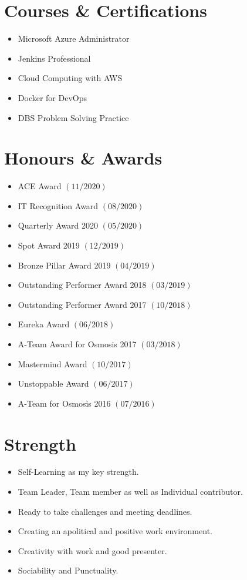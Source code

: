 \documentclass[12pt, a4paper]{article}
\begin{document}
\section*{Courses \& Certifications}
\begin{itemize}[noitemsep, nolistsep]
\item Microsoft Azure Administrator
\item Jenkins Professional
\item Cloud Computing with AWS
\item Docker for DevOps
\item DBS Problem Solving Practice
\end{itemize}

\section*{Honours \& Awards}
\begin{itemize}[noitemsep, nolistsep]
\item ACE Award $(11/2020)$
\item IT Recognition Award $(08/2020)$
\item Quarterly Award 2020 $(05/2020)$
\item Spot Award 2019 $(12/2019)$
\item Bronze Pillar Award 2019 $(04/2019)$
\item Outstanding Performer Award 2018 $(03/2019)$
\item Outstanding Performer Award 2017 $(10/2018)$
\item Eureka Award $(06/2018)$
\item A-Team Award for Osmosis 2017 $(03/2018)$
\item Mastermind Award $(10/2017)$
\item Unstoppable Award $(06/2017)$
\item A-Team for Osmosis 2016 $(07/2016)$
\end{itemize}

\section*{Strength}
\begin{itemize}[noitemsep, nolistsep]
\item Self-Learning as my key strength.
\item Team Leader, Team member as well as Individual contributor.
\item Ready to take challenges and meeting deadlines.
\item Creating an apolitical and positive work environment.
\item Creativity with work and good presenter.
\item Sociability and Punctuality.
\end{itemize}
\end{document}

